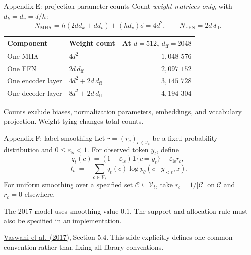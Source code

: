 \documentclass[aspectratio=169,11pt]{beamer}
\newcommand{\one}{\mathbf{1}}
\newcommand{\src}[1]{\par\vfill{\fontsize{7}{8.5}\selectfont\color{muted}#1}\par}
\newcommand{\paper}{\href{https://arxiv.org/abs/1706.03762}{Vaswani et al.\ (2017)}}
\begin{document}
\begin{frame}[t]{Appendix E: projection parameter counts}
Count \emph{weight matrices only}, with $d_k=d_v=d/h$:
\[
 N_{\mathrm{MHA}}=h(2dd_k+dd_v)+(hd_v)d=4d^2,
 \qquad N_{\mathrm{FFN}}=2d\,d_{\mathrm{ff}}.
\]
\small
\begin{tabularx}{\textwidth}{@{}lXr@{}}
\toprule
Component & Weight count & At $d=512$, $d_{\mathrm{ff}}=2048$ \\
\midrule
One MHA & $4d^2$ & $1{,}048{,}576$ \\
One FFN & $2d\,d_{\mathrm{ff}}$ & $2{,}097{,}152$ \\
One encoder layer & $4d^2+2d\,d_{\mathrm{ff}}$ & $3{,}145{,}728$ \\
One decoder layer & $8d^2+2d\,d_{\mathrm{ff}}$ & $4{,}194{,}304$ \\
\bottomrule
\end{tabularx}
\src{Counts exclude biases, normalization parameters, embeddings, and vocabulary projection. Weight tying changes total counts.}
\end{frame}

\begin{frame}[t]{Appendix F: label smoothing}
Let $r=(r_c)_{c\in\mathcal V_t}$ be a fixed probability distribution and
$0\leq\varepsilon_{\mathrm{ls}}<1$. For observed token $y_t$, define
\[
 q_t(c)=(1-\varepsilon_{\mathrm{ls}})\one\{c=y_t\}
            +\varepsilon_{\mathrm{ls}}r_c,
\]
\[
 \ell_t=-\sum_{c\in\mathcal V_t}q_t(c)
                 \log p_\theta(c\mid y_{<t},x).
\]
For uniform smoothing over a specified set $\mathcal C\subseteq\mathcal V_t$,
take $r_c=1/|\mathcal C|$ on $\mathcal C$ and $r_c=0$ elsewhere.
\par\vspace{2mm}
The 2017 model uses smoothing value $0.1$. The support and allocation
rule must also be specified in an implementation.
\src{\paper, Section 5.4. This slide explicitly defines one common convention rather than fixing all library conventions.}
\end{frame}
\end{document}

